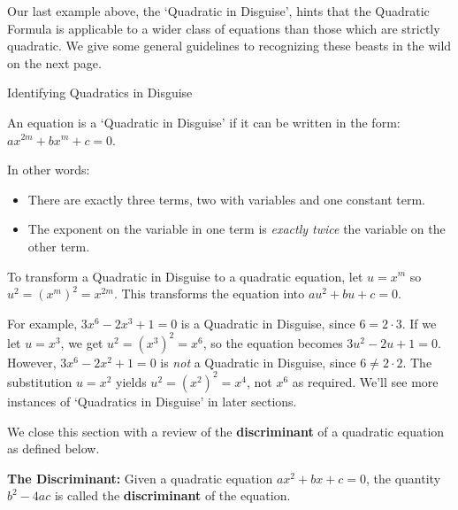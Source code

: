 Our last example above, the `Quadratic in Disguise', hints that the Quadratic Formula is applicable to a wider class of equations than those which are strictly quadratic.  We give some general guidelines to recognizing these beasts in the wild on the next page.

\begin{floatbox}[label=box:QuadinDisguise]{Identifying Quadratics in Disguise}

An equation is a `Quadratic in Disguise' if it can be written in the form:  $ax^{2m} + bx^{m} + c = 0$.  

In other words:

\begin{itemize}

\item There are exactly three terms, two with variables and one constant term.

\item  The exponent on the variable in one term is \textit{exactly twice} the variable on the other term.

\end{itemize}

To transform a Quadratic in Disguise to a quadratic equation, let $u = x^m$ so $u^2 = (x^m)^2 = x^{2m}$. This transforms the equation into $au^2 + bu + c = 0$.

\end{floatbox}

For example, $3x^6 - 2x^3 + 1 = 0$ is a Quadratic in Disguise, since $6 = 2 \cdot 3$.  If we let $u = x^3$, we get $u^2 = (x^3)^2 = x^6$, so the equation becomes $3u^2 - 2u + 1 = 0$.  However, $3x^6 - 2x^2 + 1 = 0$ is \textit{not} a Quadratic in Disguise, since $6 \neq 2\cdot 2$. The substitution $u = x^2$ yields $u^2 = (x^2)^2 = x^4$, not $x^6$ as required.  We'll see more instances of `Quadratics in Disguise' in later sections.

We close this section with a review of the \textbf{discriminant} of a quadratic equation as defined below.

\begin{tcolorbox}
    
\begin{defn} \textbf{The Discriminant:} Given a quadratic equation $ax^2 + bx + c = 0$, the quantity $b^2 - 4ac$ is called the \textbf{discriminant} of the equation.

\end{defn}

\end{tcolorbox}

